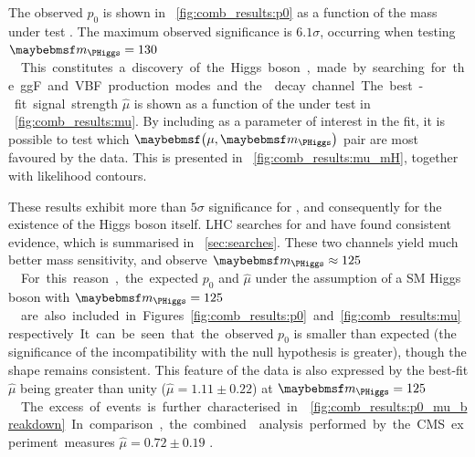 The observed $p_0$ is shown in \Figure~\ref{fig:comb_results:p0} as a function of the mass 
under test \mH.  The maximum observed significance is $6.1\sigma$, occurring when testing 
\unit{$\mH = 130$}{\GeV}. This constitutes a discovery of the Higgs boson, made by searching 
for the ggF and VBF production modes and the \WW decay channel.

The best-fit signal strength $\hat{\mu}$ is shown as a function of the \mH under test in 
\Figure~\ref{fig:comb_results:mu}. By including \mH as a parameter of interest in the fit, 
it is possible to test which $\parenths{\mu, \mH}$ pair are most favoured by the data. This 
is presented in \Figure~\ref{fig:comb_results:mu_mH}, together with likelihood contours.

These results exhibit more than $5\sigma$ significance for \HWWlvlv, and consequently for 
the existence of the Higgs boson itself. LHC searches for 
\HepProcess{\PHiggs \HepTo \Pphoton\Pphoton} and \HepProcess{\PHiggs \HepTo \PZ\PZ} have 
found consistent evidence, which is summarised in \Section~\ref{sec:searches}. These two 
channels yield much better mass sensitivity, and observe \unit{$\mH \approx 125$}{\GeV}. 
For this reason, the expected $p_0$ and $\hat{\mu}$ under the assumption of a SM Higgs boson 
with \unit{$\mH = 125$}{\GeV} are also included in Figures~\ref{fig:comb_results:p0} and 
\ref{fig:comb_results:mu} respectively. It can be seen that the observed $p_0$ is smaller 
than expected (\ie the significance of the incompatibility with the null hypothesis is 
greater), though the shape remains consistent. This feature of the data is also expressed by 
the best-fit $\hat{\mu}$ being greater than unity ($\hat{\mu} = 1.11 \pm 0.22$) at 
\unit{$\mH = 125$}{\GeV}. The excess of events is further characterised in 
\Figure~\ref{fig:comb_results:p0_mu_breakdown}. In comparison, the combined \HWW analysis 
performed by the CMS experiment measures $\hat{\mu} = 0.72 \pm 0.19$ \cite{CMS:HWW}.

